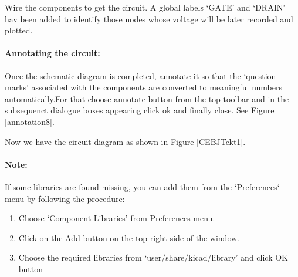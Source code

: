 

Wire the components to get the circuit. A global labels `GATE' and `DRAIN' hav been added to identify those nodes whose voltage will be later recorded and plotted.

\paragraph{Annotating the circuit:} Once the schematic diagram is completed, annotate it so that the `question marks' associated with the components are converted to meaningful numbers automatically.For that choose annotate button from the top toolbar%
and in the subsequenct dialogue boxes appearing click ok and finally close. See Figure \ref{annotation8}.




Now we have the circuit diagram as shown in Figure \ref{CEBJTckt1}.


\paragraph{Note:} If some libraries are found missing, you can add them from the `Preferences` menu by following the procedure: 

\begin{enumerate}
\item
Choose `Component Libraries' from Preferences menu.

\item
Click on the Add button on the top right side of the window.

\item
Choose the required libraries from `user/share/kicad/library' and click OK button

\end{enumerate}

